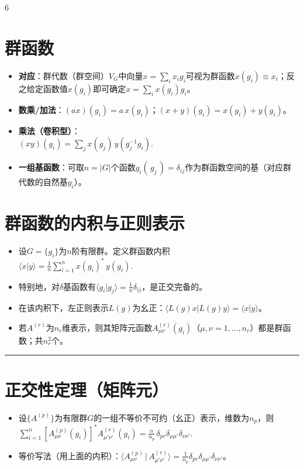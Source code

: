\documentclass[landscape]{article}
\begin{document}
\begin{multicols*}{6}
\section*{群函数}
\begin{itemize}
  \item \textbf{对应}：群代数（群空间）$V_G$中向量$x=\sum_i x_i g_i$可视为群函数$x(g_i)\equiv x_i$；反之给定函数值$x(g_i)$即可确定$x=\sum_i x(g_i)g_i$。
  \item \textbf{数乘/加法}：$(ax)(g_i)=a\,x(g_i)$；$(x+y)(g_i)=x(g_i)+y(g_i)$。
  \item \textbf{乘法（卷积型）}：
  \\
  $
  (xy)(g_i)=\sum_j x(g_j)\,y(g_j^{-1}g_i).
  $
  \item \textbf{一组基函数}：可取$n=|G|$个函数$g_i(\,g_j\,)=\delta_{ij}$作为群函数空间的基（对应群代数的自然基$g_i$）。
\end{itemize}

\section*{群函数的内积与正则表示}
\begin{itemize}
  \item 设$G=\{g_i\}$为$n$阶有限群。定义群函数内积
  \\
  $
  \langle x|y\rangle=\frac{1}{n}\sum_{i=1}^{n} x(g_i)^{*}\,y(g_i).
  $
  \item 特别地，对$\delta$基函数有$\langle g_i|g_j\rangle=\frac{1}{n}\delta_{ij}$，是正交完备的。
  \item 在该内积下，左正则表示$L(g)$为幺正：$\langle L(g)x|L(g)y\rangle=\langle x|y\rangle$。
  \item 若$A^{(r)}$为$n_r$维表示，则其矩阵元函数$A^{(r)}_{\mu\nu}(g_i)$（$\mu,\nu=1,\dots,n_r$）都是群函数；共$n_r^2$个。
\end{itemize}
\noindent\textcolor{red}{\rule{\linewidth}{1pt}}
\section*{正交性定理（矩阵元）}
\begin{itemize}
  \item 设$\{A^{(p)}\}$为有限群$G$的一组不等价不可约（幺正）表示，维数为$n_p$，则
  \\
  $
  \sum_{i=1}^{n}\left[A^{(p)}_{\mu\nu}(g_i)\right]^{*}A^{(r)}_{\mu'\nu'}(g_i)
  =\frac{n}{n_p}\,\delta_{pr}\delta_{\mu\mu'}\delta_{\nu\nu'}.
  $
  \item 等价写法（用上面的内积）：$\langle A^{(p)}_{\mu\nu}\,|\,A^{(r)}_{\mu'\nu'}\rangle=\frac{1}{n_p}\delta_{pr}\delta_{\mu\mu'}\delta_{\nu\nu'}$。
\end{itemize}


\end{multicols*}
\end{document}
